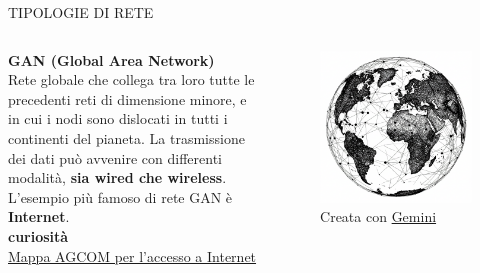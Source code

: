 \documentclass[aspectratio=1610]{beamer}
\begin{document}
\begin{frame}{TIPOLOGIE DI RETE}
    \begin{columns}
            \justifying
            \textbf{GAN (Global Area Network)} \\
            Rete globale che collega tra loro tutte le precedenti reti di dimensione minore, e in cui i nodi sono 
            dislocati in tutti i continenti del pianeta. La trasmissione dei dati può avvenire con differenti modalità, 
            \textbf{sia wired che wireless}. L'esempio più famoso di rete GAN è \textbf{Internet}.\\
            \bigskip
            \tiny{\textbf{curiosità}}\\
            \tiny{\href{https://maps.agcom.it/}{Mappa AGCOM per l'accesso a Internet}}
            \begin{figure}
                \includegraphics[width=\linewidth]{img/gan.png}
                \caption{{Creata con \href{https://gemini.google.com/}{Gemini}}}
            \end{figure}
    \end{columns}
\end{frame}
\end{document}
